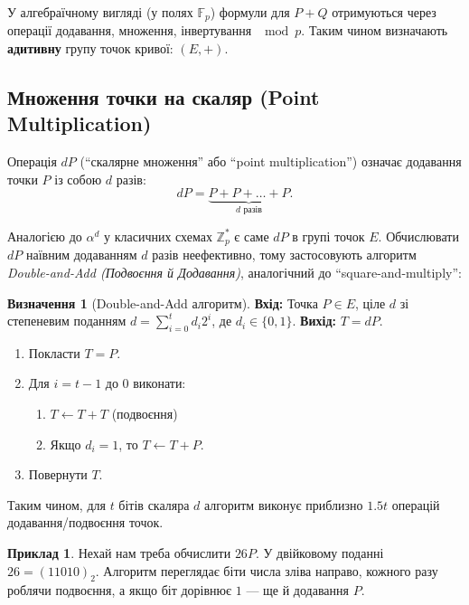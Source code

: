 \documentclass[12pt]{report}
\theoremstyle{definition}
\newtheorem{definition}{Визначення}[chapter]
\newtheorem{example}{Приклад}[chapter]
\theoremstyle{plain}
\begin{document}
У алгебраїчному вигляді (у полях \(\mathbb{F}_p\)) формули для \(P + Q\) отримуються через операції додавання, множення, інвертування \(\mod p\). Таким чином визначають \textbf{адитивну} групу точок кривої: \((E, +)\).

\subsection{Множення точки на скаляр (Point Multiplication)}

Операція \(dP\) (``скалярне множення'' або ``point multiplication'') означає додавання точки \(P\) із собою \(d\) разів:
\[
   dP = \underbrace{P + P + \ldots + P}_{d \text{ разів}}.
\]

Аналогією до \(\alpha^d\) у класичних схемах \(\mathbb{Z}_p^*\) є саме \(dP\) в групі точок \(E\). Обчислювати \(dP\) наївним додаванням \(d\) разів неефективно, тому застосовують алгоритм \textit{Double-and-Add (Подвоєння й Додавання)}, аналогічний до ``square-and-multiply'':

\begin{definition}[Double-and-Add алгоритм]
\textbf{Вхід:} Точка \(P \in E\), ціле \(d\) зі степеневим поданням \(d = \sum_{i=0}^{t} d_i 2^i\), де \(d_i \in \{0,1\}\).  
\textbf{Вихід:} \(T = dP.\)

\begin{enumerate}
    \item Покласти \(T = P\).
    \item Для \(i = t-1 \text{ до } 0\) виконати:
    \begin{enumerate}
        \item \(T \leftarrow T + T\) \quad (подвоєння)
        \item Якщо \(d_i = 1\), то \(T \leftarrow T + P\).
    \end{enumerate}
    \item Повернути \(T\).
\end{enumerate}
\end{definition}

Таким чином, для \(t\) бітів скаляра \(d\) алгоритм виконує приблизно \(1.5t\) операцій додавання/подвоєння точок.

\begin{example}
Нехай нам треба обчислити \(26P\). У двійковому поданні \(26 = (11010)_2\). Алгоритм переглядає біти числа зліва направо, кожного разу роблячи подвоєння, а якщо біт дорівнює \(1\) — ще й додавання \(P\).
\end{example}
\end{document}
